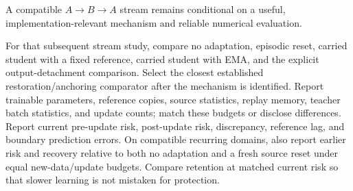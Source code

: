 \documentclass[11pt,a4paper]{article}
\begin{document}
A compatible $A\to B\to A$ stream remains conditional on a useful,
implementation-relevant mechanism and reliable numerical evaluation.

For that subsequent stream study, compare no adaptation, episodic reset,
carried student with a fixed
reference, carried student with EMA, and the explicit output-detachment
comparison. Select the closest established restoration/anchoring comparator
after the mechanism is identified. Report trainable parameters, reference
copies, source statistics, replay memory, teacher batch statistics, and
update counts; match these budgets or disclose differences. Report current
pre-update risk, post-update risk, discrepancy, reference lag, and boundary
prediction errors. On compatible recurring domains, also report earlier
risk and recovery relative to both no adaptation and a fresh source reset
under equal new-data/update budgets. Compare retention at matched current
risk so that slower learning is not mistaken for protection.
\end{document}
